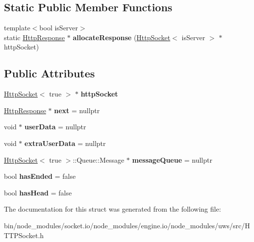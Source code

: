 \subsection*{Static Public Member Functions}
\begin{DoxyCompactItemize}
\item 
\mbox{\label{structu_w_s_1_1_http_response_afac9750f1450066d348b74dcbc8eed91}} 
{\footnotesize template$<$bool is\+Server$>$ }\\static \mbox{\hyperlink{structu_w_s_1_1_http_response}{Http\+Response}} $\ast$ {\bfseries allocate\+Response} (\mbox{\hyperlink{structu_w_s_1_1_http_socket}{Http\+Socket}}$<$ is\+Server $>$ $\ast$http\+Socket)
\end{DoxyCompactItemize}
\subsection*{Public Attributes}
\begin{DoxyCompactItemize}
\item 
\mbox{\label{structu_w_s_1_1_http_response_a2b646698754c897e317ce8224547f78b}} 
\mbox{\hyperlink{structu_w_s_1_1_http_socket}{Http\+Socket}}$<$ true $>$ $\ast$ {\bfseries http\+Socket}
\item 
\mbox{\label{structu_w_s_1_1_http_response_aedadd7d2e3b85fc511a838e131865443}} 
\mbox{\hyperlink{structu_w_s_1_1_http_response}{Http\+Response}} $\ast$ {\bfseries next} = nullptr
\item 
\mbox{\label{structu_w_s_1_1_http_response_afb153a7132316c899f374ad8012ddb3d}} 
void $\ast$ {\bfseries user\+Data} = nullptr
\item 
\mbox{\label{structu_w_s_1_1_http_response_a27a2d02f1995c46111cd66c229c4f658}} 
void $\ast$ {\bfseries extra\+User\+Data} = nullptr
\item 
\mbox{\label{structu_w_s_1_1_http_response_af6271060e1ef77c221f33373eccb48fe}} 
\mbox{\hyperlink{structu_w_s_1_1_http_socket}{Http\+Socket}}$<$ true $>$\+::Queue\+::\+Message $\ast$ {\bfseries message\+Queue} = nullptr
\item 
\mbox{\label{structu_w_s_1_1_http_response_a87b3ad30cefe201519963322b320ffd5}} 
bool {\bfseries has\+Ended} = false
\item 
\mbox{\label{structu_w_s_1_1_http_response_a29dcc601a14f5f0e339e511fc276ddf7}} 
bool {\bfseries has\+Head} = false
\end{DoxyCompactItemize}


The documentation for this struct was generated from the following file\+:\begin{DoxyCompactItemize}
\item 
bin/node\+\_\+modules/socket.\+io/node\+\_\+modules/engine.\+io/node\+\_\+modules/uws/src/H\+T\+T\+P\+Socket.\+h\end{DoxyCompactItemize}

